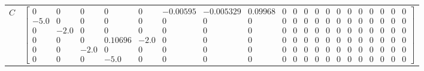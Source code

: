 \begin{tabular}{cl}
   $C$    & $\left[\begin{array}{cccccccccccccccccccc}0 & 0 & 0 & 0 & 0 & -0.00595 & -0.005329 & 0.09968 & 0 & 0 & 0 & 0 & 0 & 0 & 0 & 0 & 0 & 0 & 0 & 0\\-5.0 & 0 & 0 & 0 & 0 & 0 & 0 & 0 & 0 & 0 & 0 & 0 & 0 & 0 & 0 & 0 & 0 & 0 & 0 & 0\\0 & -2.0 & 0 & 0 & 0 & 0 & 0 & 0 & 0 & 0 & 0 & 0 & 0 & 0 & 0 & 0 & 0 & 0 & 0 & 0\\0 & 0 & 0 & 0.10696 & -2.0 & 0 & 0 & 0 & 0 & 0 & 0 & 0 & 0 & 0 & 0 & 0 & 0 & 0 & 0 & 0\\0 & 0 & -2.0 & 0 & 0 & 0 & 0 & 0 & 0 & 0 & 0 & 0 & 0 & 0 & 0 & 0 & 0 & 0 & 0 & 0\\0 & 0 & 0 & -5.0 & 0 & 0 & 0 & 0 & 0 & 0 & 0 & 0 & 0 & 0 & 0 & 0 & 0 & 0 & 0 & 0\end{array}\right]$                                                                                                                                                                                                                                                                                                                                                                                                                                                                                                                                                                                                                                                                                                                                                                                                                                                                                                                                                                                                                                                                                                                                                                                                                                                                                                                                                                                                                                                                                                                                                                                                                                                                                  \\

\end{tabular}
